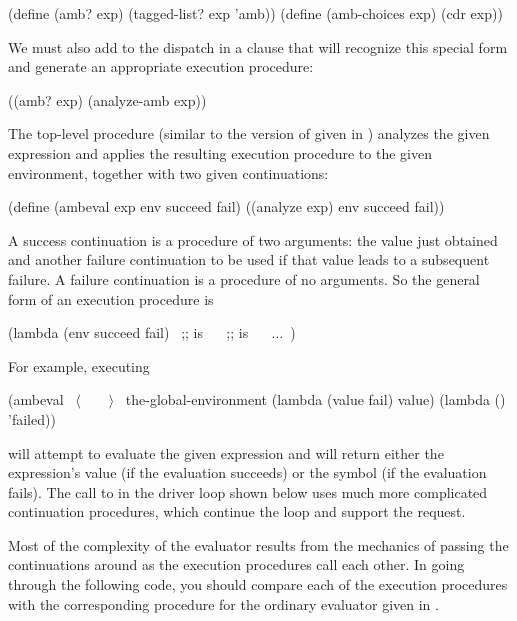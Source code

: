 \begin{codeBlock}
(define (amb? exp) (tagged-list? exp 'amb))
(define (amb-choices exp) (cdr exp))
\end{codeBlock}

\noindent
We must also add to the dispatch in  a clause that will recognize
this special form and generate an appropriate execution procedure:

\begin{codeBlock}
((amb? exp) (analyze-amb exp))
\end{codeBlock}

\noindent
The top-level procedure  (similar to the version of 
given in ) analyzes the given expression and applies the
resulting execution procedure to the given environment, together with two given
continuations:

\begin{codeBlock}
(define (ambeval exp env succeed fail)
  ((analyze exp) env succeed fail))
\end{codeBlock}

\noindent
A success continuation is a procedure of two arguments: the value just obtained
and another failure continuation to be used if that value leads to a subsequent
failure. A failure continuation is a procedure of no arguments.  So the general
form of an execution procedure is

\begin{codeBlock}
(lambda (env succeed fail)
  ~\textrm{;;  is }~
  ~\textrm{;;  is }~
  ~\( \dots \)~)
\end{codeBlock}

\noindent
For example, executing

\begin{codeBlock}
(ambeval ~\(\langle \)~~~~\(\rangle \)~
         the-global-environment
         (lambda (value fail) value)
         (lambda () 'failed))
\end{codeBlock}

\noindent
will attempt to evaluate the given expression and will return either the
expression's value (if the evaluation succeeds) or the symbol  (if
the evaluation fails).  The call to  in the driver loop shown
below uses much more complicated continuation procedures, which continue the
loop and support the  request.

Most of the complexity of the  evaluator results from the mechanics
of passing the continuations around as the execution procedures call each
other.  In going through the following code, you should compare each of the
execution procedures with the corresponding procedure for the ordinary
evaluator given in .


